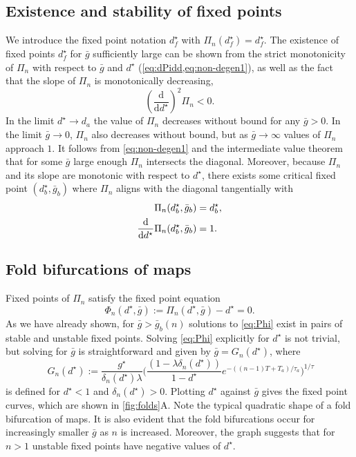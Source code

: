 \subsection{Existence and stability of fixed points}
We introduce the fixed point notation $d^\star_{f}$ with $\Pi_n(d^\star_{f})=d^\star_{f}$.
The existence of fixed points $d^\star_{f}$ for $\bar g$ sufficiently large can be shown from the strict monotonicity of $\Pi_{n}$ with respect to $\bar g$ and $d^\star$ (\cref{eq:dPidd,eq:non-degen1}), as well as the fact that the slope of $\Pi_{n}$ is monotonically decreasing,
\begin{equation}
	\label{eq:non-degen2}
	\left(\frac{\mathrm{d}}{\mathrm{d}d^\star}\right)^2 \Pi_n<0.
\end{equation}
In the limit $d^\star \to d_{a}$ the value of $\Pi_n$ decreases without bound for any $\bar g>0$.
In the limit $\bar g\to 0$, $\Pi_n$ also decreases without bound, but as $\bar g\to \infty$ values of $\Pi_n$ approach $1$.
It follows from \cref{eq:non-degen1} and the intermediate value theorem that for some $\bar g$ large enough $\Pi_n$ intersects the diagonal.
Moreover, because $\Pi_n$ and its slope are monotonic with respect to $d^\star$, there exists some critical fixed point $(d^\star_b, \bar g_b)$ where $\Pi_n$ aligns with the diagonal tangentially with
\begin{align}
	\Pi_n(d^\star_b, \bar g_b)               & =d^\star_b, \\
	\dv{}{d^\star}\Pi_n(d^\star_b, \bar g_b) & =1.
\end{align}

\subsection{Fold bifurcations of maps}
Fixed points of $\Pi_n$ satisfy the fixed point equation
\begin{equation}
	\label{eq:Phi}
	\Phi_{n}(d^{\star}, \bar g) := \Pi_{n}(d^{\star}, \bar g)-d^{\star} = 0.
\end{equation}
As we have already shown, for $\bar g > \bar g_b(n)$ solutions to \cref{eq:Phi} exist in pairs of stable and unstable fixed points.
Solving \cref{eq:Phi} explicitly for $d^{\star}$ is not trivial, but solving for $\bar g$ is straightforward and given by $\bar g= G_n(d^\star)$, where
\begin{equation}
	~\label{eq:g}
	G_{n}(d^{\star}) :=
	\frac{g^{\star}}{\delta_n(d^\star)\lambda}
	\Big(
	\frac{(1-\lambda\delta_n(d^\star)) }{1-d^\star} e^{-((n-1)T + T_{a})/\tau_a}
	\Big)^{1/\tau}
\end{equation}
is defined for $d^{\star}<1$ and $\delta_{n}(d^{\star})>0$.
Plotting $d^\star$ against $\bar g$ gives the fixed point curves, which are shown in \cref{fig:folds}A.
Note the typical quadratic shape of a fold bifurcation of maps.
It is also evident that the fold bifurcations occur for increasingly smaller $\bar g$ as $n$ is increased.
Moreover, the graph suggests that for $n>1$ unstable fixed points have negative values of $d^\star$.

